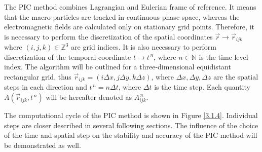 The PIC method combines Lagrangian and Eulerian frame of reference. It means that the macro-particles are tracked in continuous phase space, whereas the electromagnetic fields are calculated only on stationary grid points. Therefore, it is necessary to perform the discretization of the spatial coordinates $ \vec{r} \rightarrow \vec{r}_{i j k} $ where $ (i,j,k) \in \mathbb{Z}^{3} $ are grid indices. It is also necessary to perform discretization of the temporal coordinate $ t \rightarrow t^{\,n} $, where $ n \in \mathbb{N} $ is the time level index. The algorithm will be outlined for a three-dimensional equidistant rectangular grid, thus $ \vec{r}_{i j k} = \left(i \Delta x, j \Delta y, k \Delta z\right) $, where $ \Delta x, \Delta y, \Delta z $ are the spatial steps in each direction and $ t^{\,n} = n\Delta t $, where $ \Delta t $ is the time step. Each quantity $ A \left(\vec{r}_{i j k}, t^{\,n} \right) $ will be hereafter denoted as $ A_{ijk}^{\,n} $.

The computational cycle of the PIC method is shown in Figure \ref{3.1.4}. Individual steps are closer described in several following sections. The influence of the choice of the time and spatial step on the stability and accuracy of the PIC method will be demonstrated as well.